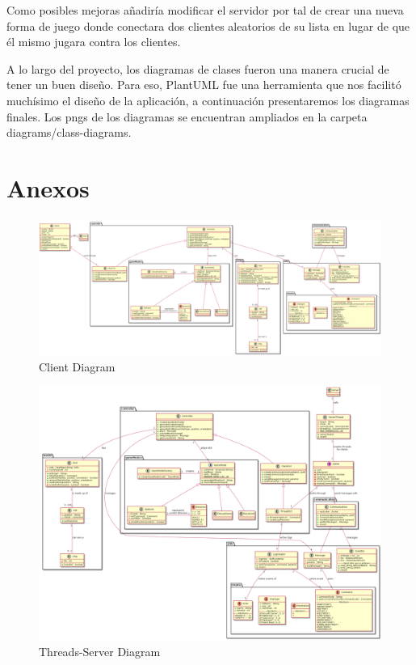 Como posibles mejoras añadiría modificar el servidor por tal de crear una nueva forma de juego donde conectara dos clientes aleatorios de su lista en lugar de que él mismo jugara contra los clientes.

A lo largo del proyecto, los diagramas de clases fueron una manera crucial de tener un buen diseño. Para eso, PlantUML fue una herramienta que nos facilitó muchísimo el diseño de la aplicación, a continuación presentaremos los diagramas finales. Los pngs de los diagramas se encuentran ampliados en la carpeta diagrams/class-diagrams.

\newpage
\section*{Anexos}
\begin{figure}
    \includegraphics[width=\textwidth,height=\textheight,keepaspectratio]{../diagrams/class-diagrams/clientClasses.png}
    \caption{Client Diagram}
    \label{fig:PropProf}
\end{figure}
\begin{figure}
    \includegraphics[width=\textwidth,height=\textheight,keepaspectratio]{../diagrams/class-diagrams/threadsClasses.png}
    \caption{Threads-Server Diagram}
    \label{fig:PropProf}
\end{figure}
